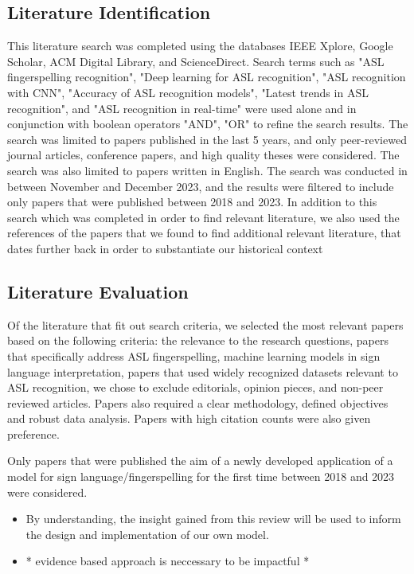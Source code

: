 \subsection{Literature Identification}
This literature search was completed using the databases IEEE Xplore, Google Scholar, ACM Digital Library, and ScienceDirect. Search terms such as "ASL fingerspelling recognition", "Deep learning for ASL recognition",  "ASL recognition with CNN", "Accuracy of ASL recognition models", "Latest trends in ASL recognition", and "ASL recognition in real-time" were used alone and in conjunction with boolean operators "AND", "OR" to refine the search results. The search was limited to papers published in the last 5 years, and only peer-reviewed journal articles, conference papers, and high quality theses were considered. The search was also limited to papers written in English. The search was conducted in between November and December 2023, and the results were filtered to include only papers that were published between 2018 and 2023.
In addition to this search which was completed in order to find relevant literature, we also used the references of the papers that we found to find additional relevant literature, that dates further back in order to substantiate our historical context
\subsection{Literature Evaluation}
Of the literature that fit out search criteria, we selected the most relevant papers based on the following criteria: the relevance to the research questions, papers that specifically address ASL fingerspelling, machine learning models in sign language interpretation, papers that used widely recognized datasets relevant to ASL recognition, we chose to exclude editorials, opinion pieces, and non-peer reviewed articles. Papers also required a clear methodology, defined objectives and robust data analysis. Papers with high citation counts were also given preference.

Only papers that were published the aim of a newly developed application of a model for sign language/fingerspelling for the first time between 2018 and 2023 were considered.

\begin{landscape}
    
\end{landscape}

\begin{itemize}
    \item By understanding, the insight gained from this review will be used to inform the design and implementation of our own model.
    \item * evidence based approach is neccessary to be impactful *

\end{itemize}

